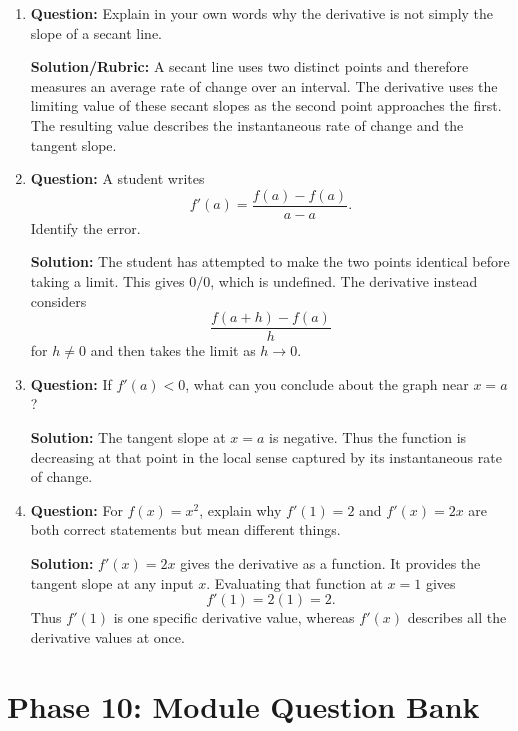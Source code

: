 \documentclass{article}
\begin{document}
\begin{enumerate}
    \item \textbf{Question:} Explain in your own words why the derivative is not simply the slope of a secant line.

    \textbf{Solution/Rubric:}
    A secant line uses two distinct points and therefore measures an average rate of change over an interval. The derivative uses the limiting value of these secant slopes as the second point approaches the first. The resulting value describes the instantaneous rate of change and the tangent slope.

    \item \textbf{Question:} A student writes
    \[
        f'(a)
        =
        \frac{f(a)-f(a)}{a-a}.
    \]
    Identify the error.

    \textbf{Solution:}
    The student has attempted to make the two points identical before taking a limit. This gives $0/0$, which is undefined. The derivative instead considers
    \[
        \frac{f(a+h)-f(a)}{h}
    \]
    for $h\neq0$ and then takes the limit as $h\to0$.

    \item \textbf{Question:} If $f'(a)<0$, what can you conclude about the graph near $x=a$?

    \textbf{Solution:}
    The tangent slope at $x=a$ is negative. Thus the function is decreasing at that point in the local sense captured by its instantaneous rate of change.

    \item \textbf{Question:} For $f(x)=x^2$, explain why $f'(1)=2$ and $f'(x)=2x$ are both correct statements but mean different things.

    \textbf{Solution:}
    $f'(x)=2x$ gives the derivative as a function. It provides the tangent slope at any input $x$. Evaluating that function at $x=1$ gives
    \[
        f'(1)=2(1)=2.
    \]
    Thus $f'(1)$ is one specific derivative value, whereas $f'(x)$ describes all the derivative values at once.
\end{enumerate}

\section*{Phase 10: Module Question Bank}
\end{document}
